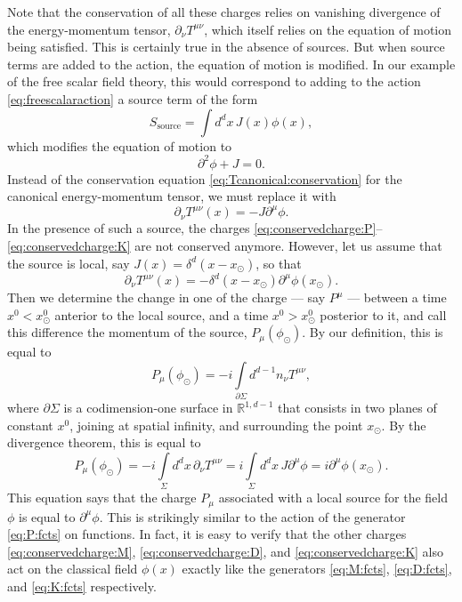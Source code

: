 \documentclass[a4paper,12pt]{article}
\numberwithin{equation}{section}
\begin{document}
Note that the conservation of all these charges relies on vanishing divergence of the energy-momentum tensor, $\partial_\nu T^{\mu\nu}$, which itself relies on the equation of motion being satisfied.
This is certainly true in the absence of sources. But when source terms are added to the action, the equation of motion is modified.
In our example of the free scalar field theory, this would correspond to adding to the action \eqref{eq:freescalaraction} a source term of the form
\begin{equation}
	S_\text{source} = \int d^dx \, J(x) \phi(x),
\end{equation}
which modifies the equation of motion to
\begin{equation}
	\partial^2 \phi + J = 0.
\end{equation}
Instead of the conservation equation \eqref{eq:Tcanonical:conservation} for the canonical energy-momentum tensor, we must replace it with
\begin{equation}
	\partial_\nu T^{\mu\nu}(x) = - J \partial^\mu \phi.
\end{equation}
In the presence of such a source, the charges \eqref{eq:conservedcharge:P}--\eqref{eq:conservedcharge:K} are not conserved anymore.
However, let us assume that the source is local, say $J(x) = \delta^d(x - x_\odot)$, so that
\begin{equation}
	\partial_\nu T^{\mu\nu}(x) = -\delta^d(x - x_\odot)
	\partial^\mu \phi(x_\odot).
\end{equation}
Then we determine the change in one of the charge --- say $P^\mu$ ---
between a time $x^0 < x_\odot^0$ anterior to the local source, and a time $x^0 > x_\odot^0$ posterior to it, and call this difference the momentum of the source, $P_\mu(\phi_\odot)$. 
By our definition, this is equal to
\begin{equation}
	P_\mu(\phi_\odot) = -i \int\limits_{\partial\Sigma} d^{d-1} n_\nu
	T^{\mu\nu},
\end{equation}
where $\partial\Sigma$ is a codimension-one surface in $\mathds{R}^{1,d-1}$ that consists in two planes of constant $x^0$, joining at spatial infinity, and surrounding the point $x_\odot$.
By the divergence theorem, this is equal to 
\begin{equation}
	P_\mu(\phi_\odot) = -i \int\limits_{\Sigma} d^dx \, \partial_\nu
	T^{\mu\nu}
	= i \int\limits_{\Sigma} d^dx \, J \partial^\mu \phi
	= i \partial^\mu \phi(x_\odot).
	\label{eq:P:localsource}
\end{equation}
This equation says that the charge $P_\mu$ associated with a local source for the field $\phi$ is equal to $\partial^\mu \phi$. This is strikingly similar to the action of the generator \eqref{eq:P:fcts} on functions. In fact, it is easy to verify that the other charges \eqref{eq:conservedcharge:M}, \eqref{eq:conservedcharge:D}, and \eqref{eq:conservedcharge:K} also act on the classical field $\phi(x)$ exactly like the generators \eqref{eq:M:fcts}, \eqref{eq:D:fcts}, and \eqref{eq:K:fcts} respectively.
\end{document}
